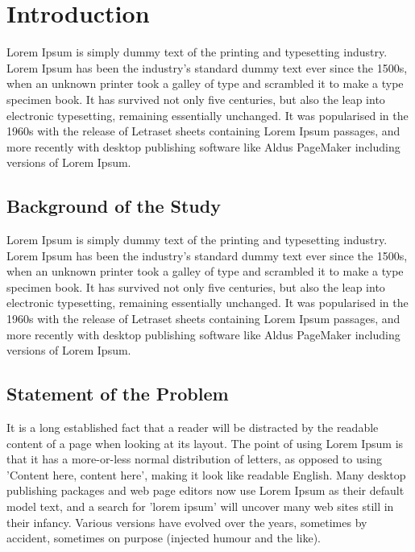 \section{Introduction}
\label{Introduction}
Lorem Ipsum is simply dummy text of the printing and typesetting industry. Lorem Ipsum has been the industry's standard dummy text ever since the 1500s, when an unknown printer took a galley of type and scrambled it to make a type specimen book. It has survived not only five centuries, but also the leap into electronic typesetting, remaining essentially unchanged. It was popularised in the 1960s with the release of Letraset sheets containing Lorem Ipsum passages, and more recently with desktop publishing software like Aldus PageMaker including versions of Lorem Ipsum.

\subsection{Background of the Study}
Lorem Ipsum\cite{DUMMY:1} is simply dummy text of the printing and typesetting industry. Lorem Ipsum has been the industry's standard dummy text ever since the 1500s, when an unknown printer took a galley of type and scrambled it to make a type specimen book. It has survived not only five centuries, but also the leap into electronic typesetting, remaining essentially unchanged. It was popularised in the 1960s with the release of Letraset sheets containing Lorem Ipsum passages, and more recently with desktop publishing software like Aldus PageMaker including versions of Lorem Ipsum.

\subsection{Statement of the Problem}
It is a long established fact that a reader will be distracted by the readable content of a page when looking at its layout. The point of using Lorem Ipsum is that it has a more-or-less normal distribution of letters, as opposed to using 'Content here, content here', making it look like readable English. Many desktop publishing packages and web page editors now use Lorem Ipsum as their default model text, and a search for 'lorem ipsum' will uncover many web sites still in their infancy. Various versions have evolved over the years, sometimes by accident, sometimes on purpose (injected humour and the like).

